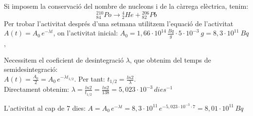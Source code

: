\begin{solapartat}
 Si imposem la conservació del nombre de nucleons i de la càrrega elèctrica, tenim:
\[ {}^{210}_{84}Po \rightarrow {}^{4}_{2}He + {}^{206}_{82}Pb \]
 Per trobar l'activitat després d'una setmana utilitzem l'equació de l'activitat $A(t) = A_0\,e^{-\lambda t}$, on l'activitat inicial: $A_0 = 1,66\cdot 10^{14}\,\frac{Bq}{g}\cdot 5\cdot 10^{-3}\ g = 8,3\cdot 10^{11}\ Bq$,

 Necessitem el coeficient de desintegració $\lambda$, que obtenim del temps de semidesintegració:\\
$A(t) = \frac{A_0}{2} = A_0\,e^{-\lambda t_{1/2}}$. Per tant: $t_{1/2} = \frac{ln2}{\lambda}$.\\
Directament obtenim: $\lambda = \frac{ln2}{t_{1/2}} = \frac{ln2}{138} = 5,023\cdot 10^{-3}\,dies^{-1}$

 L'activitat al cap de 7 dies: $A = A_0\,e^{-\lambda t} = 8,3\cdot 10^{11}\,e^{-5,023\cdot 10^{-3}\cdot 7} = 8,01\cdot 10^{11}\,Bq$
\end{solapartat}

